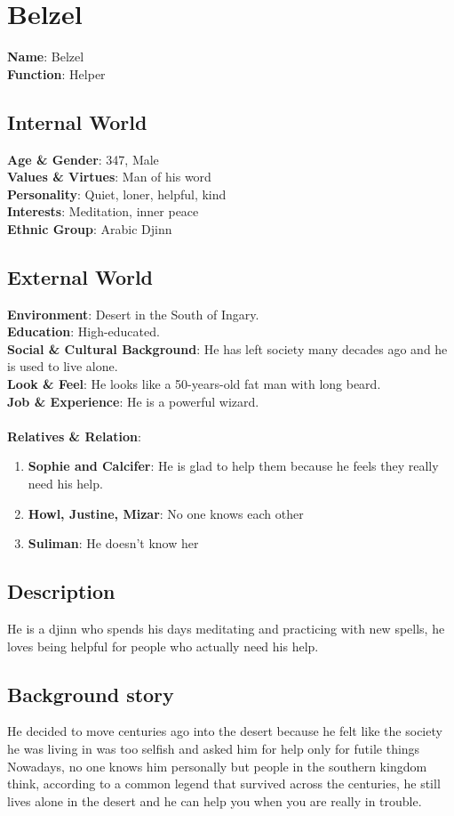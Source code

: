 \section{Belzel}

\textbf{Name}: Belzel \\
\textbf{Function}: Helper

\subsection{Internal World}

\textbf{Age \& Gender}: 347, Male \\
\textbf{Values \& Virtues}: Man of his word  \\
\textbf{Personality}: Quiet, loner, helpful, kind \\
\textbf{Interests}: Meditation, inner peace \\
\textbf{Ethnic Group}: Arabic Djinn

\subsection{External World}
\textbf{Environment}: Desert in the South of Ingary.  \\
\textbf{Education}: High-educated. \\
\textbf{Social \& Cultural Background}: He has left society many decades ago and he is used to live alone. \\
\textbf{Look \& Feel}: He looks like a 50-years-old fat man with long beard. \\
\textbf{Job \& Experience}: He is a powerful wizard. \\
\\
\textbf{Relatives \& Relation}:
\begin{enumerate}
\item \textbf{Sophie and Calcifer}: He  is glad to help them because he feels they really need his help.
\item \textbf{Howl, Justine, Mizar}: No one knows each other
\item \textbf{Suliman}: He doesn’t know her
\end{enumerate}

\subsection{Description}
He is a djinn who spends his days meditating and practicing with new spells, he loves being helpful for people who actually need his help. 


\subsection{Background story}
He decided to move centuries ago into the desert because he felt like the society he was living in was too selfish and asked him for help only for futile things 
Nowadays, no one knows him personally but people in the southern kingdom think, according to a common legend that survived across the centuries, he still lives alone in the desert and he can help you when you are really in trouble.



